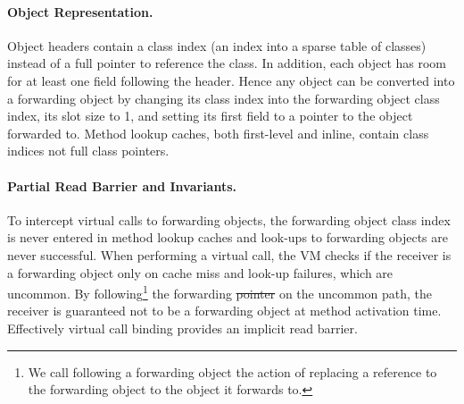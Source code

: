 \documentclass[sigplan,10pt,review,anonymous]{acmart}\settopmatter{printfolios=true,printccs=false,printacmref=false}
\providecommand{\DIFadd}[1]{{\protect\color{blue}\uwave{#1}}} %
\providecommand{\DIFdel}[1]{{\protect\color{red}\sout{#1}}}                      %
\providecommand{\DIFaddbegin}{} %
\providecommand{\DIFaddend}{} %
\providecommand{\DIFdelbegin}{} %
\providecommand{\DIFdelend}{} %
\begin{document}

\paragraph{Object Representation.}
Object headers contain a class index (an index into a sparse table of classes) instead of a full pointer to reference the class. In addition, each object has room for at least one field following the header. Hence any object can be converted into a forwarding object by changing its class index into the forwarding object class index, its slot size to 1, and setting its first field to a pointer to the object forwarded to. Method lookup caches, both first-level and inline, contain class indices not full class pointers.

\paragraph{Partial Read Barrier and Invariants.} 
To intercept virtual calls to forwarding objects, the forwarding object class index is never entered in method lookup caches and look-ups to forwarding objects are never successful. When performing a virtual call, the VM checks if the receiver is a forwarding object only on cache miss and look-up failures, which are uncommon. By following\footnote{We call following a forwarding object the action of replacing a reference to the forwarding object to the object it forwards to.} the forwarding \DIFdelbegin \DIFdel{pointer }\DIFdelend \DIFaddbegin \DIFadd{object }\DIFaddend on the uncommon path, the receiver is guaranteed not to be a forwarding object at method activation time. Effectively virtual call binding provides an implicit read barrier.
\end{document}
